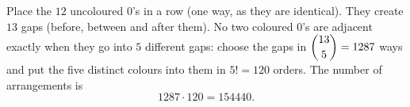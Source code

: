 Place the $12$ uncoloured $0$'s in a row (one way, as they are identical). They create $13$ gaps (before, between and after them). No two coloured $0$'s are adjacent exactly when they go into $5$ different gaps: choose the gaps in $\dbinom{13}{5}=1287$ ways and put the five distinct colours into them in $5!=120$ orders. The number of arrangements is
\[1287\cdot120=\boxed{154440}.\]
